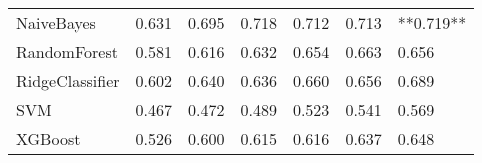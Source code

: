 \begin{tabular}{lllllll}
                     NaiveBayes & 0.631 &                     0.695 &                 0.718 &                  0.712 &                                   0.713 & **0.719** \\
                   RandomForest & 0.581 &                     0.616 &                 0.632 &                  0.654 &                                   0.663 &     0.656 \\
                RidgeClassifier & 0.602 &                     0.640 &                 0.636 &                  0.660 &                                   0.656 &     0.689 \\
                            SVM & 0.467 &                     0.472 &                 0.489 &                  0.523 &                                   0.541 &     0.569 \\
                        XGBoost & 0.526 &                     0.600 &                 0.615 &                  0.616 &                                   0.637 &     0.648 \\
\bottomrule
\end{tabular}
